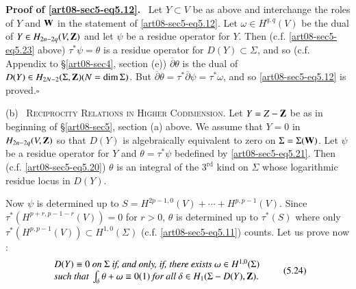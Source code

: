 \noindent
{\bf Proof of \eqref{art08-sec5-eq5.12}.}~ Let $Y\subset V$ be as above and interchange the roles of $Y$ and $\mathbf{W}$ in the statement of \eqref{art08-sec5-eq5.12}. Let $\omega\in H^{q,q}(V)$ be the dual of $Y\in H_{2n-2q}(V,\mathbf{Z})$ and let $\psi$ be a residue operator for $Y$. Then (c.f. \eqref{art08-sec5-eq5.23} above) $\tau^{*}\psi=\theta$ is a residue operator for $D(Y)\subset \Sigma$, and so (c.f. Appendix to \S\ref{art08-sec4}, section (e)) $\overline{\partial}\theta$ is the dual of $D(Y)\in H_{2N-2}(\Sigma,\mathbf{Z})(N=\dim \Sigma)$. But $\overline{\partial}\theta=\tau^{*}\overline{\partial}\psi=\tau^{*}\omega$, and so \eqref{art08-sec5-eq5.12} is proved.\hfill$\square$

\medskip
(b)~ \textsc{Reciprocity Relations in Higher Codimension.} Let $Y=Z-\mathbf{Z}$ be as in beginning of \S\ref{art08-sec5}, section (a) above. We assume that $Y=0$ in $H_{2n-2q}(V,\mathbf{Z})$ so that $D(Y)$ is algebraically equivalent to zero on $\Sigma=\Sigma(\mathbf{W})$. Let $\psi$ be a residue operator for $Y$ and $\theta=\tau^{*}\psi$ be\pageoriginale defined by \eqref{art08-sec5-eq5.21}. Then (c.f. \eqref{art08-sec5-eq5.20}) $\theta$ is an integral of the $3^{\text{rd}}$ kind on $\Sigma$ whose logarithmic residue locus in $D(Y)$.

Now $\psi$ is determined up to $S=H^{2p-1,0}(V)+\cdots+H^{p,p-1}(V)$. Since $\tau^{*}(H^{p+r,p-1-r}(V))=0$ for $r>0$, $\theta$ is determined up to $\tau^{*}(S)$ where only $\tau^{*}(H^{p,p-1}(V))\subset H^{1,0}(\Sigma)$ (c.f. \eqref{art08-sec5-eq5.11}) counts. Let us prove now :
\begin{equation*}
\begin{array}{l}
D(Y)\equiv 0\text{~\em on~} \Sigma \text{~\em if, and only, if, there exists~}\omega\in H^{1,0}(\Sigma)\\
\text{\em such that~}\int_{\delta}\theta+\omega\equiv 0(1)\text{~\em for all~}\delta\in H_{1}(\Sigma-D(Y),\mathbf{Z}).
\end{array}\tag{5.24}\label{art08-sec5-eq5.24}
\end{equation*}

\eject


